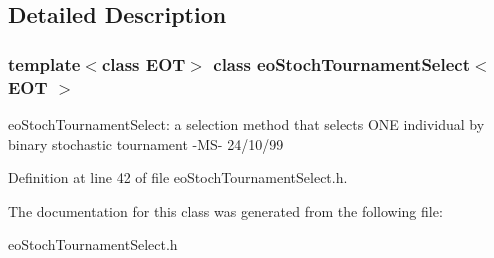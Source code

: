 \subsection{Detailed Description}
\subsubsection*{template$<$class EOT$>$ class eo\-Stoch\-Tournament\-Select$<$ EOT $>$}

eo\-Stoch\-Tournament\-Select: a selection method that selects ONE individual by binary stochastic tournament -MS- 24/10/99 



Definition at line 42 of file eo\-Stoch\-Tournament\-Select.h.

The documentation for this class was generated from the following file:\begin{CompactItemize}
\item 
eo\-Stoch\-Tournament\-Select.h\end{CompactItemize}
